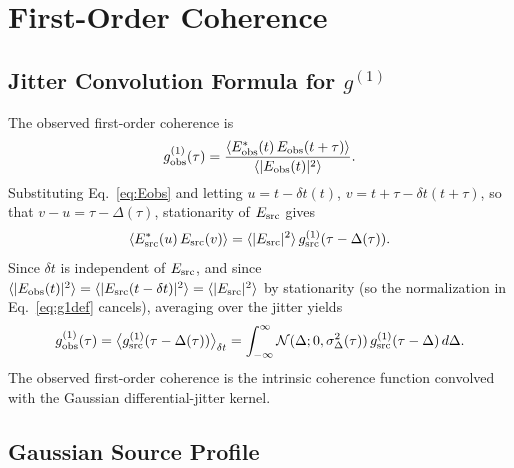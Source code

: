 \documentclass[aps,prd,onecolumn,amsmath,amssymb]{revtex4-2}
\begin{document}
\section{First-Order Coherence }
\label{sec:g1}

\subsection{Jitter Convolution Formula for $g^{(1)}$}

The observed first-order coherence is
\begin{equation}
  g^{(1)}_{\rm obs}(\tau) = \frac{\langle E^*_{\rm obs}(t)\,E_{\rm obs}(t+\tau)\rangle}
                                  {\langle|E_{\rm obs}(t)|^2\rangle}.
  \label{eq:g1def}
\end{equation}
Substituting Eq.~\eqref{eq:Eobs} and letting
$u = t - \delta t(t)$, $v = t+\tau - \delta t(t+\tau)$, so that
$v - u = \tau - \Delta(\tau)$, stationarity of $E_{\rm src}$ gives
\begin{equation}
  \langle E^*_{\rm src}(u)\,E_{\rm src}(v)\rangle
  = \langle|E_{\rm src}|^2\rangle\,g^{(1)}_{\rm src}(\tau - \Delta(\tau)).
\end{equation}
Since $\delta t$ is independent of $E_{\rm src}$, and since
$\langle|E_{\rm obs}(t)|^2\rangle = \langle|E_{\rm src}(t-\delta t)|^2\rangle
= \langle|E_{\rm src}|^2\rangle$ by stationarity (so the normalization
in Eq.~\eqref{eq:g1def} cancels), averaging over the jitter yields
\begin{equation}
  g^{(1)}_{\rm obs}(\tau)
    = \big\langle g^{(1)}_{\rm src}(\tau - \Delta(\tau))\big\rangle_{\delta t}
    = \int_{-\infty}^{\infty} \mathcal{N}(\Delta;0,\sigma_\Delta^2(\tau))\,
      g^{(1)}_{\rm src}(\tau - \Delta)\,d\Delta.
  \label{eq:g1obs}
\end{equation}
The observed first-order coherence is the intrinsic coherence function
convolved with the Gaussian differential-jitter kernel.

\subsection{Gaussian Source Profile}
\label{sec:closedforms}
\end{document}
